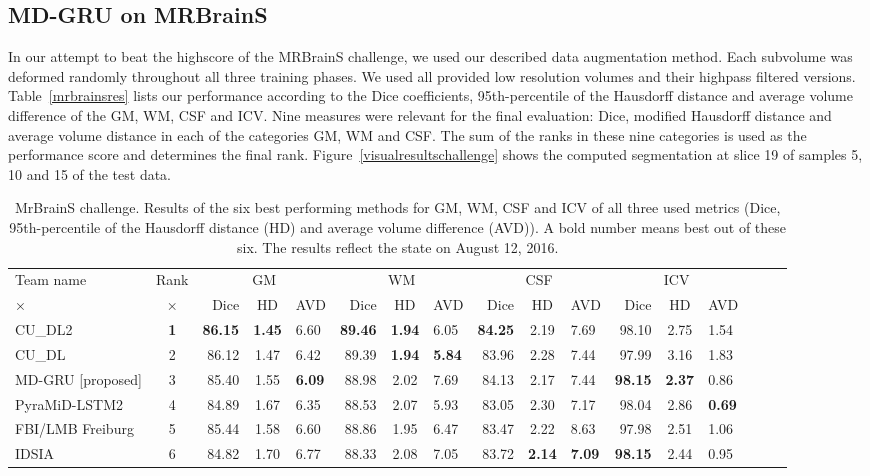 \documentclass[runningheads,a4paper]{llncs}
\begin{document}
\subsection{MD-GRU on MRBrainS}
In our attempt to beat the highscore of the MRBrainS challenge, we used our described data augmentation method. Each subvolume was deformed randomly throughout all three training phases. We used all provided low resolution volumes and their highpass filtered versions. Table~\ref{mrbrainsres} lists our performance according to the Dice coefficients, 95th-percentile  of the Hausdorff distance and average volume difference of the GM, WM, CSF and ICV. Nine measures were relevant for the final evaluation: Dice, modified Hausdorff distance and average volume distance in each of the categories GM, WM and CSF. The sum of the ranks in these nine categories is used as the performance score and determines the final rank. 
Figure~\ref{visualresultschallenge} shows the computed segmentation at slice 19 of samples 5, 10 and 15 of the test data. 
\begin{table}
\begin{center}
 \caption{MrBrainS challenge. Results of the six best performing methods for GM, WM, CSF and ICV of all three used metrics (Dice, 95th-percentile of the Hausdorff distance (HD) and average volume difference (AVD)). A bold number means best out of these six. The results reflect the state on August 12, 2016.}
\label{mrbrainsres}
 \scriptsize
\begin{tabular}{l c rcl rcl rcl rcl rcl}
\toprule
Team name &  Rank &\multicolumn{3}{c}{GM} & \multicolumn{3}{c}{WM} & \multicolumn{3}{c}{CSF} &  \multicolumn{3}{c}{ICV}\\%
×& × & Dice & HD & AVD & Dice & HD & AVD & Dice & HD & AVD & Dice & HD & AVD \\\midrule
CU\_DL2  & \textbf{1}& \textbf{86.15} & \textbf{1.45} & 6.60 & \textbf{89.46} & \textbf{1.94} & 6.05 & \textbf{84.25}& 2.19 & 7.69 &  98.10 & 2.75 & 1.54\\
CU\_DL& 2  & 86.12 & 1.47 & 6.42 & 89.39 & \textbf{1.94} & \textbf{5.84} & 83.96 & 2.28 & 7.44 &  97.99 & 3.16 & 1.83 \\
MD-GRU [proposed] & 3 & 85.40 & 1.55 & \textbf{6.09} & 88.98 & 2.02 & 7.69 & 84.13 & 2.17 & 7.44 & \textbf{98.15} & \textbf{2.37} & 0.86\\
PyraMiD-LSTM2 & 4 & 84.89 & 1.67 & 6.35 & 88.53 & 2.07 & 5.93 & 83.05 & 2.30 & 7.17 &  98.04 & 2.86 & \textbf{0.69}\\
FBI/LMB Freiburg~\cite{cicek_3d_2016}& 5 & 85.44 & 1.58 & 6.60 & 88.86 & 1.95 & 6.47 & 83.47 & 2.22 & 8.63 &  97.98 & 2.51 & 1.06\\
IDSIA~\cite{stollenga_parallel_2015} & 6 & 84.82 & 1.70 & 6.77 & 88.33 & 2.08 & 7.05& 83.72 & \textbf{2.14} & \textbf{7.09}& \textbf{98.15} & 2.44 & 0.95\\\bottomrule
\end{tabular}
\end{center}
 \label{resultschallenge}
\end{table}
\end{document}
